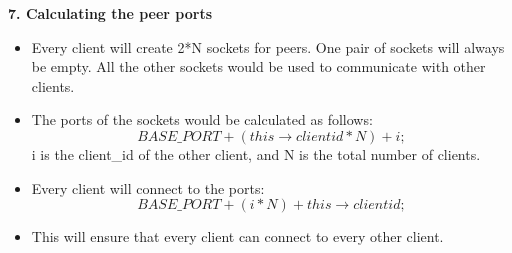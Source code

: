 \documentclass[12pt]{scrartcl}
\begin{document}
\textbf{7. Calculating the peer ports}

\begin{itemize}
    \item Every client will create 2*N sockets for peers. One pair of sockets will always be empty. All the other sockets would be used to communicate with other clients.
    \item The ports of the sockets would be calculated as follows: $$BASE\_PORT + (this\rightarrow clientid * N) + i;$$
    i is the client\_id of the other client, and N is the total number of clients.
    \item Every client will connect to the ports:  $$BASE\_PORT + (i * N) + this\rightarrow clientid;$$
    \item This will ensure that every client can connect to every other client.
\end{itemize}
\end{document}
